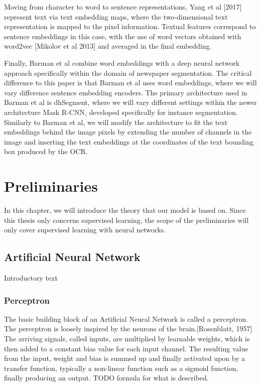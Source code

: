 \documentclass[english, bibtex]{kththesis}
\begin{document}
Moving from character to word to sentence representations, Yang et al [2017] represent text via text embedding maps, where the two-dimensional text representation is mapped to the pixel information. Textual features correspond to sentence embeddings in this case, with the use of word vectors obtained with word2vec [Mikolov et al 2013] and averaged in the final embedding. 

Finally, Barman et al combine word embeddings with a deep neural network approach specifically within the domain of newspaper segmentation. The critical difference to this paper is that Barman et al uses word embeddings, where we will vary difference sentence embedding encoders. The primary architecture used in Barman et al is dhSegment, where we will vary different settings within the newer architecture Mask R-CNN, developed specifically for instance segmentation. Similarly to Barman et al, we will modify the architecture to fit the text embeddings behind the image pixels by extending the number of channels in the image and inserting the text embeddings at the coordinates of the text bounding box produced by the OCR. 

\cleardoublepage
\chapter{Preliminaries}
\label{ch:preliminaries}

In this chapter, we will introduce the theory that our model is based on. Since this thesis only concerns supervised learning, the scope of the preliminaries will only cover supervised learning with neural networks.

\section{Artificial Neural Network}

Introductory text

\subsection{Perceptron}
The basic building block of an Artificial Neural Network is called a perceptron. The perceptron is loosely inspired by the neurons of the brain.[Rosenblatt, 1957] The arriving signals, called inputs, are multiplied by learnable weights, which is then added to a constant bias value for each input channel. The resulting value from the input, weight and bias is summed up and finally activated upon by a transfer function, typically a non-linear function such as a sigmoid function, finally producing an output. TODO formula for what is described.
\end{document}
